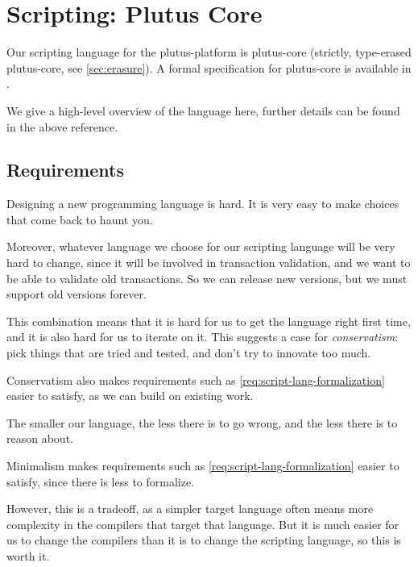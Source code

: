 \section{Scripting: Plutus Core}
\label{sec:plutus-core}


Our scripting language for the \gls{plutus-platform} is \gls{plutus-core} (strictly, type-erased \gls{plutus-core}, see \cref{sec:erasure}).
A formal specification for \gls{plutus-core} is available in \textcite{plutus-core-spec}.

We give a high-level overview of the language here, further details can be found in the above reference.

\subsection{Requirements}
\begin{requirement}[Conservatism]
\label{req:script-lang-conservatism}
Designing a new programming language is hard.
It is very easy to make choices that come back to haunt you.

Moreover, whatever language we choose for our scripting language will be very hard to change, since it will be involved in transaction validation, and we want to be able to validate old transactions.
So we can release new versions, but we must support old versions forever.

This combination means that it is hard for us to get the language right first time, and it is also hard for us to iterate on it.
This suggests a case for \emph{conservatism}: pick things that are tried and tested, and don't try to innovate too much.

Conservatism also makes requirements such as \cref{req:script-lang-formalization} easier to satisfy, as we can build on existing work.
\end{requirement}

\begin{requirement}[Minimalism]
\label{req:script-lang-minimalism}
The smaller our language, the less there is to go wrong, and the less there is to reason about.

Minimalism makes requirements such as \cref{req:script-lang-formalization} easier to satisfy, since there is less to formalize.

However, this is a tradeoff, as a simpler target language often means more complexity in the compilers that target that language.
But it is much easier for us to change the compilers than it is to change the scripting language, so this is worth it.
\end{requirement}

